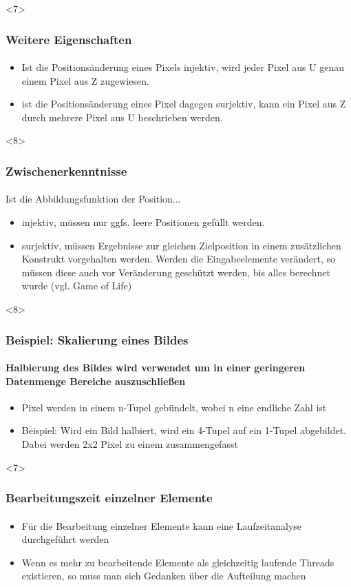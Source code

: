 \documentclass{beamer}
\begin{document}
\begin{frame}<7>
  \frametitle{Weitere Eigenschaften}
  \framesubtitle{}
  
  \begin{itemize}
    \item Ist die Positionsänderung eines Pixels injektiv, wird jeder Pixel aus U genau einem Pixel aus Z zugewiesen.
    \item ist die Positionsänderung eines Pixel dagegen surjektiv, kann ein Pixel aus Z durch mehrere Pixel aus U beschrieben werden.
  \end{itemize}
  
\end{frame}

\begin{frame}<8>
  \frametitle{Zwischenerkenntnisse}
  \framesubtitle{}
    
  \begin{center}
    Ist die Abbildungsfunktion der Position...
  \end{center}
  
  \begin{itemize}
    \item  injektiv, müssen nur ggfs. leere Positionen gefüllt werden.
    \item  surjektiv, müssen Ergebnisse zur gleichen Zielposition in einem zusätzlichen Konstrukt vorgehalten werden. Werden die Eingabeelemente verändert, so müssen diese auch vor Veränderung geschützt werden, bis alles berechnet wurde (vgl. Game of Life)
  \end{itemize}

  
\end{frame}

\begin{frame}<8>
  \frametitle{Beispiel: Skalierung eines Bildes}
  \framesubtitle{Halbierung des Bildes wird verwendet um in einer geringeren Datenmenge Bereiche auszuschließen}

  \begin{itemize}
    \item Pixel werden in einem n-Tupel gebündelt, wobei n eine endliche Zahl ist 
    \item Beispiel: Wird ein Bild halbiert, wird ein 4-Tupel auf ein 1-Tupel abgebildet. Dabei werden 2x2 Pixel zu einem zusammengefasst
  \end{itemize}
  
\end{frame}


\begin{frame}<7>
  \frametitle{Bearbeitungszeit einzelner Elemente}
  \framesubtitle{}
  
  \begin{itemize}
    \item Für die Bearbeitung einzelner Elemente kann eine Laufzeitanalyse durchgeführt werden
    \item Wenn es mehr zu bearbeitende Elemente als gleichzeitig laufende Threads existieren, so muss man sich Gedanken über die Aufteilung machen
  \end{itemize}

\end{frame}
\end{document}

